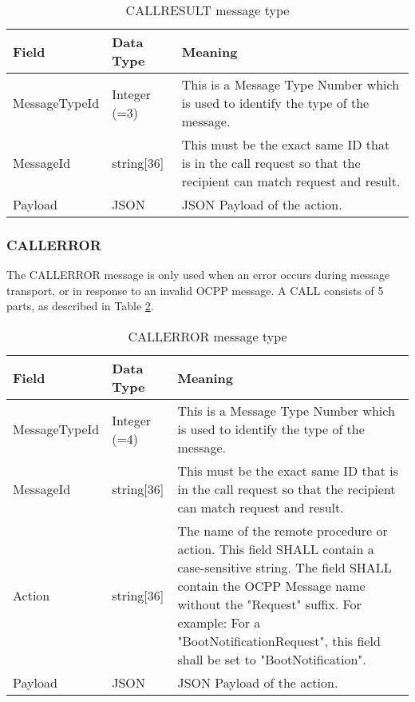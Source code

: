 \documentclass[12pt,openany,a4paper]{book}
\begin{document}
\begin{table}[H]
\begin{tabular}{ |p{3cm}|p{2.5cm}|p{9cm}| }
 \hline
\textbf{Field} & \textbf{Data Type} & \textbf{Meaning}
\\
 \hline MessageTypeId & Integer (=3) & This is a Message Type Number which is used to identify the type of the message.\\
 \hline MessageId & string[36] & This must be the exact same ID that is in the call request so that the recipient can match request and result.\\
 \hline Payload & JSON & JSON Payload of the action.\\
 \hline
\end{tabular}
\caption{CALLRESULT message type \cite{ocpp4}}
\label{tab:CALLRESULT}
\end{table}


\subsubsection{CALLERROR}
The CALLERROR message is only used when an error occurs during message transport, or in response to an invalid OCPP message. A CALL consists of 5 parts, as described in Table \ref{tab:CALLERROR}. 
\begin{table}[htp]
\begin{tabular}{ |p{3cm}|p{2.5cm}|p{9cm}| }
 \hline
\textbf{Field} & \textbf{Data Type} & \textbf{Meaning}
\\
 \hline MessageTypeId & Integer (=4)& This is a Message Type Number which is used to identify the type of the message.\\
 \hline MessageId & string[36] & This must be the exact same ID that is in the call request so that the recipient can match request and result.\\
 \hline Action & string[36] & The name of the remote procedure or action. This field SHALL contain a case-sensitive string.
The field SHALL contain the OCPP Message name without the "Request" suffix. For example: For
a "BootNotificationRequest", this field shall be set to "BootNotification".\\
 \hline Payload & JSON & JSON Payload of the action.\\
 \hline
\end{tabular}
\caption{CALLERROR message type \cite{ocpp4}}
\label{tab:CALLERROR}
\end{table}
\end{document}
